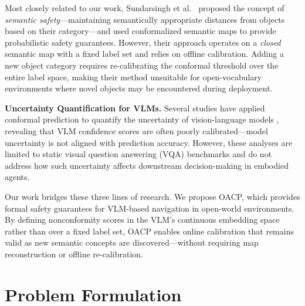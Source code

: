 \documentclass[letterpaper, 10 pt, conference]{ieeeconf}  %
\begin{document}
Most closely related to our work, Sundarsingh et al.\ \cite{sundarsingh2026safeplanningunknownenvironments} proposed the concept of \textit{semantic safety}---maintaining semantically appropriate distances from objects based on their category---and used conformalized semantic maps to provide probabilistic safety guarantees. However, their approach operates on a \textit{closed} semantic map with a fixed label set and relies on offline calibration. Adding a new object category requires re-calibrating the conformal threshold over the entire label space, making their method unsuitable for open-vocabulary environments where novel objects may be encountered during deployment.

\textbf{Uncertainty Quantification for VLMs.}
Several studies have applied conformal prediction to quantify the uncertainty of vision-language models \cite{kostumov2024uncertaintyawareevaluationvisionlanguagemodels}, revealing that VLM confidence scores are often poorly calibrated---model uncertainty is not aligned with prediction accuracy. However, these analyses are limited to static visual question answering (VQA) benchmarks and do not address how such uncertainty affects downstream decision-making in embodied agents.

Our work bridges these three lines of research. We propose OACP, which provides formal safety guarantees for VLM-based navigation in open-world environments. By defining nonconformity scores in the VLM’s continuous embedding space rather than over a fixed label set, OACP enables online calibration that remains valid as new semantic concepts are discovered---without requiring map reconstruction or offline re-calibration.


\section{Problem Formulation}
\end{document}
